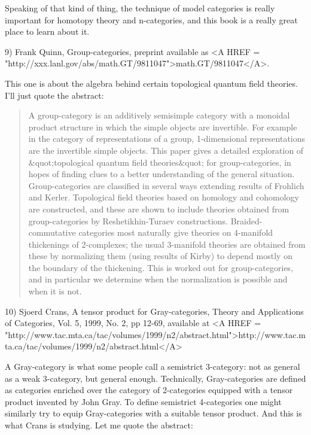 Speaking of that kind of thing, the technique of model categories is 
really important for homotopy theory and n-categories, and this book
is a really great place to learn about it.  

9) Frank Quinn, Group-categories, preprint available as 
<A HREF = "http://xxx.lanl.gov/abs/math.GT/9811047">math.GT/9811047</A>.

This one is about the algebra behind certain topological quantum field 
theories.  I'll just quote the abstract:

\begin{quote}
     A group-category is an additively semisimple category with a
     monoidal product structure in which the simple objects are
     invertible. For example in the category of representations of a
     group, 1-dimensional representations are the invertible simple
     objects. This paper gives a detailed exploration of &quot;topological
     quantum field theories&quot; for group-categories, in hopes of finding
     clues to a better understanding of the general situation.
     Group-categories are classified in several ways extending results
     of Frohlich and Kerler. Topological field theories based on homology
     and cohomology are constructed, and these are shown to include
     theories obtained from group-categories by Reshetikhin-Turaev
     constructions. Braided-commutative categories most naturally give
     theories on 4-manifold thickenings of 2-complexes; the usual
     3-manifold theories are obtained from these by normalizing them
     (using results of Kirby) to depend mostly on the boundary of the
     thickening. This is worked out for group-categories, and in
     particular we determine when the normalization is possible and when
     it is not.
\end{quote}
    
10) Sjoerd Crans, A tensor product for Gray-categories, 
Theory and Applications of Categories, Vol. 5, 1999, No. 2, pp 12-69, 
available at <A HREF = "http://www.tac.mta.ca/tac/volumes/1999/n2/abstract.html">http://www.tac.mta.ca/tac/volumes/1999/n2/abstract.html</A>
 
A Gray-category is what some people call a semistrict 3-category: not as
general as a weak 3-category, but general enough.  Technically,
Gray-categories are defined as categories enriched over the category of
2-categories equipped with a tensor product invented by John Gray.  To
define semistrict 4-categories one might similarly try to equip
Gray-categories with a suitable tensor product.  And this is what Crans
is studying.  Let me quote the abstract:

